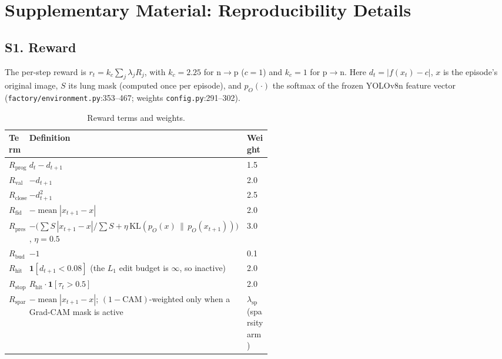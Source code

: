 \section*{Supplementary Material: Reproducibility Details}
\setcounter{table}{0}
\renewcommand{\thetable}{S\arabic{table}}


\subsection*{S1. Reward}

The per-step reward is $r_t = k_c \sum_j \lambda_j R_j$, with $k_c = 2.25$ for n$\to$p ($c = 1$) and $k_c = 1$ for p$\to$n. Here $d_t = |f(x_t) - c|$, $x$ is the episode's original image, $S$ its lung mask (computed once per episode), and $p_O(\cdot)$ the softmax of the frozen YOLOv8n feature vector (\texttt{factory/environment.py}:353--467; weights \texttt{config.py}:291--302).

\begin{table}[t]
\centering
\small
\begin{tabular}{@{}lp{0.52\linewidth}l@{}}
\toprule
Term & Definition & Weight \\
\midrule
$R_{\text{prog}}$ & $d_t - d_{t+1}$ & 1.5 \\
$R_{\text{val}}$ & $-d_{t+1}$ & 2.0 \\
$R_{\text{close2}}$ & $-d_{t+1}^2$ & 2.5 \\
$R_{\text{fid}}$ & $-\operatorname{mean}|x_{t+1} - x|$ & 2.0 \\
$R_{\text{pres}}$ & $-\big(\sum S\,|x_{t+1} - x| / \sum S + \eta\,\mathrm{KL}(p_O(x)\,\|\,p_O(x_{t+1}))\big)$, $\eta = 0.5$ & 3.0 \\
$R_{\text{bud}}$ & $-1$ & 0.1 \\
$R_{\text{hit}}$ & $\mathbf{1}[d_{t+1} < 0.08]$ (the $L_1$ edit budget is $\infty$, so inactive) & 2.0 \\
$R_{\text{stop}}$ & $R_{\text{hit}} \cdot \mathbf{1}[\tau_t > 0.5]$ & 2.0 \\
$R_{\text{sparsity}}$ & $-\operatorname{mean}|x_{t+1} - x|$; $(1-\text{CAM})$-weighted only when a Grad-CAM mask is active & $\lambda_{\text{sp}}$ (sparsity arm) \\
\bottomrule
\end{tabular}
\caption{Reward terms and weights.}
\end{table}

